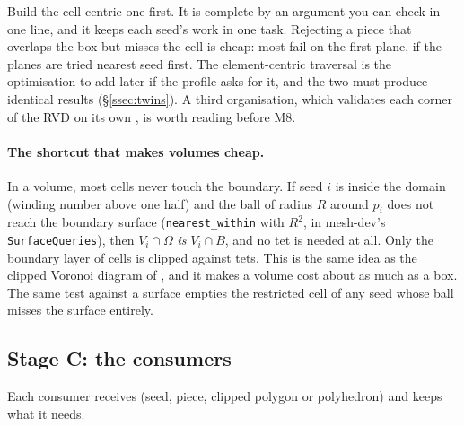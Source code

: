 \documentclass[11pt,a4paper]{article}
\newcommand{\code}[1]{\texttt{#1}}          %
\newcommand{\secref}[1]{\S\ref{#1}}
\begin{document}
Build the cell-centric one first. It is complete by an argument you can check in one line, and it
keeps each seed's work in one task. Rejecting a piece that overlaps the box but misses the cell
is cheap: most fail on the first plane, if the planes are tried nearest seed first. The
element-centric traversal is the optimisation to add later if the profile asks for it, and the
two must produce identical results (\secref{ssec:twins}). A third organisation, which validates
each corner of the RVD on its own \citep{sainlot2017}, is worth reading before M8.

\paragraph{The shortcut that makes volumes cheap.} In a volume, most cells never touch the
boundary. If seed $i$ is inside the domain (winding number above one half) and the ball of radius
$R$ around $p_i$ does not reach the boundary surface (\code{nearest\_within} with $R^2$, in
mesh-dev's \code{SurfaceQueries}), then $V_i \cap \Omega$ \emph{is} $V_i \cap B$, and no tet is
needed at all. Only the boundary layer of cells is clipped against tets. This is the same idea as
the clipped Voronoi diagram of \citet{yan2013}, and it makes a volume cost about as much as a
box. The same test against a surface empties the restricted cell of any seed whose ball misses
the surface entirely.

\subsection{Stage C: the consumers}\label{ssec:consumers}

Each consumer receives (seed, piece, clipped polygon or polyhedron) and keeps what it needs.
\end{document}
